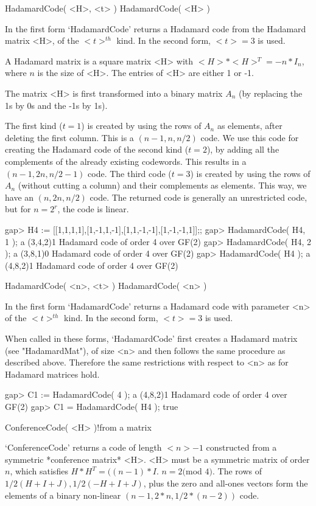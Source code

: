 \>HadamardCode( <H>, <t> )
\>HadamardCode( <H> )

In the   first form `HadamardCode'  returns   a  Hadamard code  from  the
Hadamard matrix <H>, of the  $<t>^{th}$ kind. In the  second form, $<t> =
3$ is used.

A Hadamard  matrix is a  square  matrix <H>  with $<H>*<H>^T = -n*I_n$,
where $n$ is the size of <H>. The entries of <H> are either 1 or -1.

The matrix <H>  is first   transformed into a   binary  matrix $A_n$  (by
replacing the 1s by 0s and the -1s by 1s).

The first kind ($t=1$) is created by using the rows of $A_n$ as elements,
after deleting the first column. This is a $(n-1, n,  n/2)$ code.  We use
this code for creating the  Hadamard code of the  second kind ($t=2$), by
adding   all the  complements of   the already  existing  codewords. This
results in a $(n-1, 2n, n/2 -1)$ code.  The third code ($t=3$) is created
by  using   the  rows of $A_n$   (without  cutting  a  column)  and their
complements as elements.  This way, we have an  $(n, 2n, n/2)$ code.  The
returned code is generally  an unrestricted code,  but for $n = 2^r$, the
code is linear.

\beginexample
gap> H4 := [[1,1,1,1],[1,-1,1,-1],[1,1,-1,-1],[1,-1,-1,1]];;
gap> HadamardCode( H4, 1 );
a (3,4,2)1 Hadamard code of order 4 over GF(2)
gap> HadamardCode( H4, 2 );
a (3,8,1)0 Hadamard code of order 4 over GF(2)
gap> HadamardCode( H4 );
a (4,8,2)1 Hadamard code of order 4 over GF(2) 
\endexample

\>HadamardCode( <n>, <t> )
\>HadamardCode( <n> )

In  the first form `HadamardCode'  returns a Hadamard code with parameter
<n> of the $<t>^{th}$ kind. In the second form, $<t>=3$ is used.

When called   in these  forms,  `HadamardCode' first  creates a  Hadamard
matrix (see  "HadamardMat"),   of size  <n>  and  then follows  the  same
procedure as   described above.  Therefore  the  same  restrictions  with
respect to <n> as for Hadamard matrices hold.

\beginexample
gap> C1 := HadamardCode( 4 );
a (4,8,2)1 Hadamard code of order 4 over GF(2)
gap> C1 = HadamardCode( H4 );
true 
\endexample

\>ConferenceCode( <H> )!{from a matrix}

`ConferenceCode'   returns a code  of length  $<n>-1$  constructed from a
symmetric *conference matrix*  <H>.  <H> must be   a symmetric matrix  of
order $n$, which satisfies $H*H^T = ((n-1)*I$. $n =  2 ($mod $4)$. The
rows  of $1/2(H+I+J), 1/2(-H+I+J)$,  plus  the zero  and all-ones vectors
form  the elements of   a binary non-linear $(n-1,   2*n, 1/2 * (n-2))$
code.

